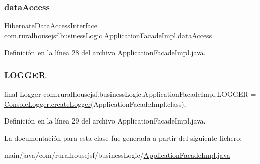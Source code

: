 \subsubsection{\texorpdfstring{dataAccess}{dataAccess}}
{\footnotesize\ttfamily \mbox{\hyperlink{a00148}{Hibernate\+Data\+Access\+Interface}} com.\+ruralhousejsf.\+business\+Logic.\+Application\+Facade\+Impl.\+data\+Access\hspace{0.3cm}{\ttfamily [private]}}



Definición en la línea 28 del archivo Application\+Facade\+Impl.\+java.

\mbox{\label{a00132_a4d2aed9fcae945d5ffaa63947bb56cde}} 
\subsubsection{\texorpdfstring{LOGGER}{LOGGER}}
{\footnotesize\ttfamily final Logger com.\+ruralhousejsf.\+business\+Logic.\+Application\+Facade\+Impl.\+L\+O\+G\+G\+ER = \mbox{\hyperlink{a00220_a520321643663e37d95761134a35505cd}{Console\+Logger.\+create\+Logger}}(Application\+Facade\+Impl.\+class)\hspace{0.3cm}{\ttfamily [static]}, {\ttfamily [private]}}



Definición en la línea 29 del archivo Application\+Facade\+Impl.\+java.



La documentación para esta clase fue generada a partir del siguiente fichero\+:\begin{DoxyCompactItemize}
\item 
main/java/com/ruralhousejsf/business\+Logic/\mbox{\hyperlink{a00005}{Application\+Facade\+Impl.\+java}}\end{DoxyCompactItemize}

